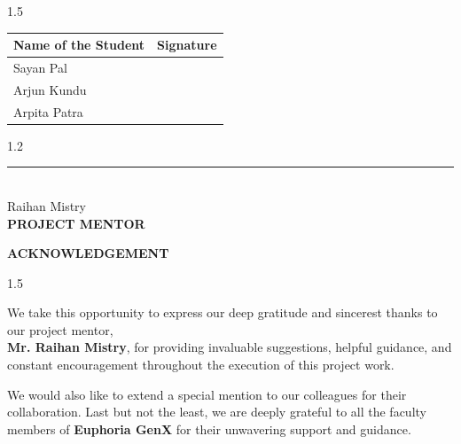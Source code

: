 \documentclass[12pt,a4paper]{article}
\begin{document}
\vspace{0.35in}

\begin{center}
\begin{spacing}{1.5}
{\fontsize{16}{24}\selectfont
\begin{tabular}{|p{2.4in}|p{2in}|}
\hline
\textbf{Name of the Student} & \textbf{Signature} \\ \hline
Sayan Pal   & \rule{0pt}{0.5in} \\ \hline
Arjun Kundu & \rule{0pt}{0.5in} \\ \hline
Arpita Patra & \rule{0pt}{0.5in} \\ \hline
\end{tabular}
}
\end{spacing}
\end{center}

\vspace{0.8in}

\begin{flushleft}
\begin{spacing}{1.2}
{\fontsize{16}{24}\selectfont
\noindent\rule{2.5in}{0.4pt}\\
\vspace{0.05in}
Raihan Mistry\\
\textbf{PROJECT MENTOR}
}
\end{spacing}
\end{flushleft}



\newpage

\begin{center}

\vspace*{0.2in}

{\fontsize{18}{22}\selectfont
\textbf{ACKNOWLEDGEMENT}
}

\end{center}

\vspace{0.6in}

{\fontsize{18}{22}\selectfont

\begin{spacing}{1.5}

\noindent
We take this opportunity to express our deep gratitude and sincerest thanks to our project mentor, \\
\textbf{Mr. Raihan Mistry}, for providing invaluable suggestions, helpful guidance, and constant encouragement throughout the execution of this project work.

\vspace{0.25in}

\noindent
We would also like to extend a special mention to our colleagues for their collaboration. Last but not the least, we are deeply grateful to all the faculty members of \textbf{Euphoria GenX} for their unwavering support and guidance.

\end{spacing}

}
\end{document}
